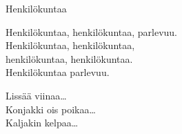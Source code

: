 \begin{song}{Henkilökuntaa}

    \repetitionbegin{} Henkilökuntaa, henkilökuntaa, parlevuu. \repetitionend{}\\
    Henkilökuntaa, henkilökuntaa,\\
    henkilökuntaa, henkilökuntaa.\\
    \repetitionbegin{} Henkilökuntaa parlevuu. \repetitionend{}

    Lissää viinaa\dots\\
    Konjakki ois poikaa\dots\\
    Kaljakin kelpaa\dots

\end{song}